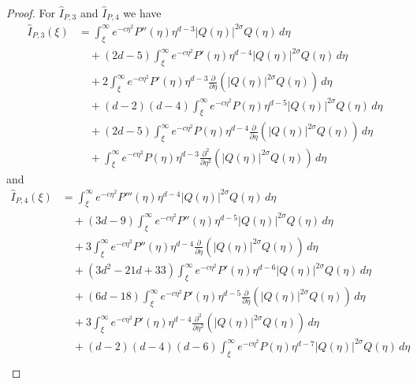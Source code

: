 \documentclass[11pt]{article}
\begin{document}
\begin{proof}
  For \(\hat{I}_{P,3}\) and \(\hat{I}_{P,4}\) we have
  \begin{align*}
    \hat{I}_{P,3}(\xi)
    &= \int_{\xi}^{\infty}e^{-c\eta^{2}}
      P''(\eta)\eta^{d - 3}|Q(\eta)|^{2\sigma}Q(\eta)
      \,d\eta\\
    &\quad + (2d - 5)\int_{\xi}^{\infty}e^{-c\eta^{2}}
      P'(\eta)\eta^{d - 4}|Q(\eta)|^{2\sigma}Q(\eta)
      \,d\eta\\
    &\quad + 2\int_{\xi}^{\infty}e^{-c\eta^{2}}
      P'(\eta)\eta^{d - 3}\frac{\partial}{\partial \eta}\left(|Q(\eta)|^{2\sigma}Q(\eta)\right)
      \,d\eta\\
    &\quad + (d - 2)(d - 4)\int_{\xi}^{\infty}e^{-c\eta^{2}}
      P(\eta)\eta^{d - 5}|Q(\eta)|^{2\sigma}Q(\eta)
      \,d\eta\\
    &\quad + (2d - 5)\int_{\xi}^{\infty}e^{-c\eta^{2}}
      P(\eta)\eta^{d - 4}\frac{\partial}{\partial \eta}\left(|Q(\eta)|^{2\sigma}Q(\eta)\right)
      \,d\eta\\
    &\quad + \int_{\xi}^{\infty}e^{-c\eta^{2}}
      P(\eta)\eta^{d - 3}\frac{\partial^{2}}{\partial \eta^{2}}\left(|Q(\eta)|^{2\sigma}Q(\eta)\right)
      \,d\eta
  \end{align*}
  and
  \begin{align*}
    \hat{I}_{P,4}(\xi)
    &= \int_{\xi}^{\infty}e^{-c\eta^{2}}
      P'''(\eta)\eta^{d - 4}|Q(\eta)|^{2\sigma}Q(\eta)
      \,d\eta\\
    &\quad + (3d - 9)\int_{\xi}^{\infty}e^{-c\eta^{2}}
      P''(\eta)\eta^{d - 5}|Q(\eta)|^{2\sigma}Q(\eta)
      \,d\eta\\
    &\quad + 3\int_{\xi}^{\infty}e^{-c\eta^{2}}
      P''(\eta)\eta^{d - 4}\frac{\partial}{\partial \eta}\left(|Q(\eta)|^{2\sigma}Q(\eta)\right)
      \,d\eta\\
    &\quad + (3d^{2} - 21d + 33)\int_{\xi}^{\infty}e^{-c\eta^{2}}
      P'(\eta)\eta^{d - 6}|Q(\eta)|^{2\sigma}Q(\eta)
      \,d\eta\\
    &\quad + (6d - 18)\int_{\xi}^{\infty}e^{-c\eta^{2}}
      P'(\eta)\eta^{d - 5}\frac{\partial}{\partial \eta}\left(|Q(\eta)|^{2\sigma}Q(\eta)\right)
      \,d\eta\\
    &\quad + 3\int_{\xi}^{\infty}e^{-c\eta^{2}}
      P'(\eta)\eta^{d - 4}\frac{\partial^{2}}{\partial \eta^{2}}\left(|Q(\eta)|^{2\sigma}Q(\eta)\right)
      \,d\eta\\
    &\quad + (d - 2)(d - 4)(d - 6)\int_{\xi}^{\infty}e^{-c\eta^{2}}
      P(\eta)\eta^{d - 7}|Q(\eta)|^{2\sigma}Q(\eta)
      \,d\eta\\

\end{align*}
\end{proof}
\end{document}
